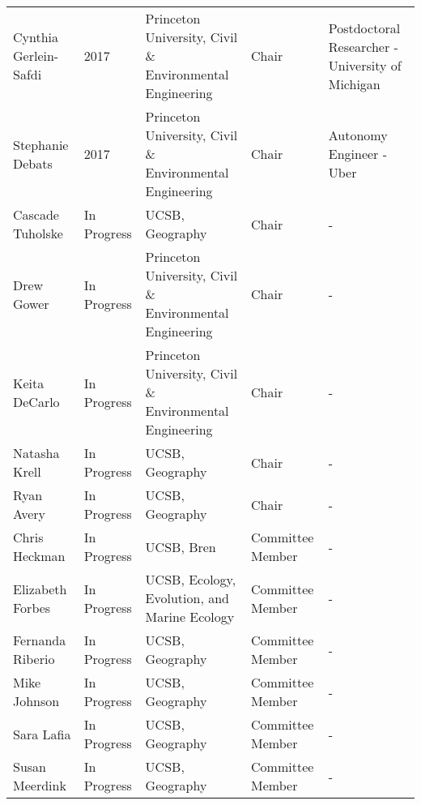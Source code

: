 
\begin{supertabular}{lp{1.5cm} p{3.5cm}p{2cm}p{4.5cm}}
Cynthia Gerlein-Safdi & 2017 & Princeton University, Civil \& Environmental Engineering & Chair & Postdoctoral Researcher - University of Michigan\\
Stephanie Debats & 2017 & Princeton University, Civil \& Environmental Engineering & Chair & Autonomy Engineer - Uber\\
Cascade Tuholske & In Progress & UCSB, Geography & Chair &  - \\
Drew Gower & In Progress & Princeton University, Civil \& Environmental Engineering & Chair &  - \\
Keita DeCarlo & In Progress & Princeton University, Civil \& Environmental Engineering & Chair &  - \\
Natasha Krell & In Progress & UCSB, Geography & Chair &  - \\
Ryan Avery & In Progress & UCSB, Geography & Chair &  - \\
Chris Heckman & In Progress & UCSB, Bren & Committee Member &  - \\
Elizabeth Forbes & In Progress & UCSB, Ecology, Evolution, and Marine Ecology & Committee Member &  - \\
Fernanda Riberio & In Progress & UCSB, Geography & Committee Member &  - \\
Mike Johnson & In Progress & UCSB, Geography & Committee Member &  - \\
Sara Lafia & In Progress & UCSB, Geography & Committee Member &  - \\
Susan Meerdink & In Progress & UCSB, Geography & Committee Member &  - \\
\end{supertabular}

